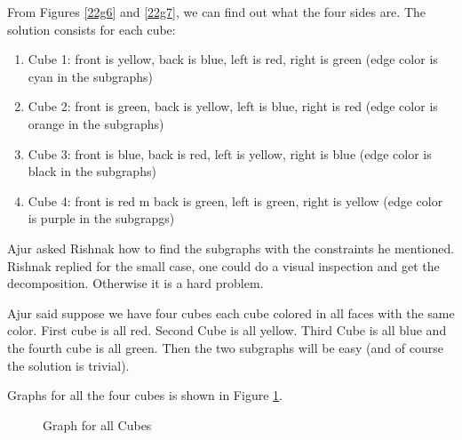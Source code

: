 From Figures \ref{22g6} and \ref{22g7}, we can find out what the four sides are. 
The solution consists for each cube:
\begin{enumerate}
    \item Cube 1: front is yellow, back is blue, left is red, right is green (edge color is cyan in the subgraphs)
    \item Cube 2: front is green, back is yellow, left is blue, right is red (edge color is orange in the subgraphs)
    \item Cube 3: front is blue, back is red, left is yellow, right is blue (edge color is black in the subgraphs)
    \item Cube 4: front is red m back is green, left is green, right is yellow (edge color is purple in the subgrapgs)
    
\end{enumerate}

Ajur asked Rishnak how to find the subgraphs with the constraints he mentioned. Rishnak replied for the small case, one could do a visual inspection and get the decomposition. Otherwise it is a hard problem.

Ajur said suppose we have four cubes each cube colored in all faces with the same color. First cube is all red. Second Cube is all yellow. Third Cube is all blue and the fourth cube is all green. Then the two subgraphs will be easy (and of course the solution is trivial).

Graphs for all the four cubes is shown in Figure \ref{22g8}.

\begin{figure}[h]
\begin{center}
\caption{ Graph for all Cubes}\label{22g8}
\end{center}
\end{figure}

